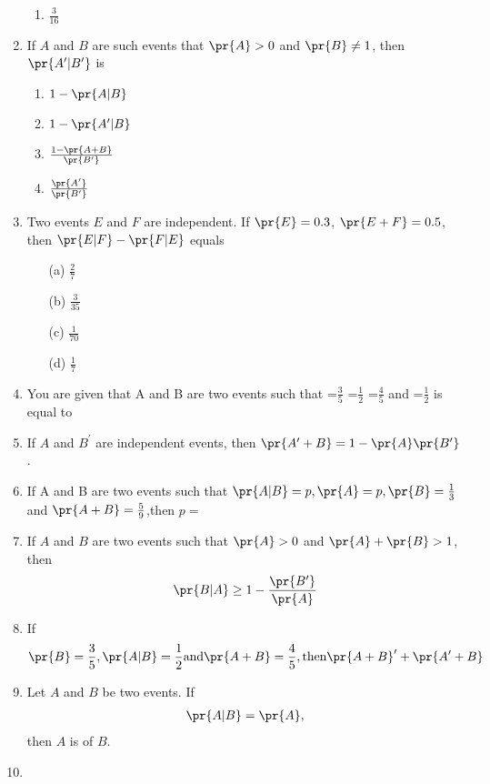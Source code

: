 \begin{enumerate}[label=\thesection.\arabic*,ref=\thesection.\theenumi]
\begin{enumerate}
	\item $\frac{3}{16}$	
\end{enumerate}
\solution
%
\item If $A$ and $B$ are such events that $\pr{A} > 0$ and $\pr{B}\neq 1$, then $\pr{A^\prime|B^\prime}$ is
\begin{enumerate}
\item $1-\pr{A|B}$
\item $1-\pr{A^\prime|B}$
\item $\frac{1-\pr{A+B}}{\pr{B^\prime}}$
\item $\frac{\pr{A^\prime}}{\pr{B^\prime}}$
\end{enumerate}
%
\item  Two events $E$ and $F$ are independent. If $\pr{E} = 0.3$, $\pr{E+F} = 0.5$, then $\pr{E|F}-\pr{F|E}$ equals
\begin{enumerate}
    \item[(a)] $\frac{2}{7}$
    \item[(b)] $\frac{3}{35}$
    \item[(c)] $\frac{1}{70}$
    \item[(d)] $\frac{1}{7}$
\end{enumerate}
\solution
%
\item You are given that A and B are two events such that =$\frac{3}{5}$ =$\frac{1}{2}$ =$\frac{4}{5}$ and =$\frac{1}{2}$   is equal to\\
%
\item If $A$ and $B^\prime$ are independent events, then $\pr{A^\prime+B}=1-\pr{A}\pr{B^\prime}$.\\
%
\item If A and B are two events such that $\pr{A|B}=p,\pr{A}=p,\pr{B}=\frac{1}{3}$ and $\pr{A+B}=\frac{5}{9}$,then $p=$\\
\solution
%
\item If $A$ and $B$ are two events such that $\pr{A} > 0$ and $\pr{A} + \pr{B} > 1$, then 
\begin{align*}
    \pr{B | A} \geq 1 - \frac{\pr{B^\prime}}{\pr{A}}
\end{align*}
\solution
%
\item If 
\begin{align}
\pr{B} = \frac{3}{5},
\pr{A|B} = \frac{1}{2} \text{and}
\pr{A + B} = \frac{4}{5}, \text{then}
\pr{A + B}^{\prime} + \pr{A^{\prime} + B}
\end{align}
\solution
%
\item Let $A$ and $B$ be two events. If 
\begin{align}
\pr{A|B} = \pr{A},
\end{align} 
then $A$ is of $B$.\\
\solution
%
\item


\end{enumerate}
